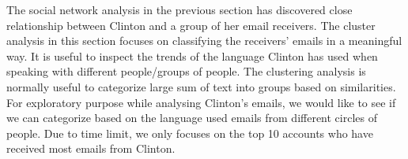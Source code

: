 The social network analysis in the previous section has discovered close relationship between Clinton and a group of her email receivers. The cluster analysis in this section focuses on classifying the receivers' emails in a meaningful way. It is useful to inspect the trends of the language Clinton has used when speaking with different people/groups of people. The clustering analysis is normally useful to categorize large sum of text into groups based on similarities. For exploratory purpose while analysing Clinton's emails, we would like to see if we can categorize based on the language used emails from different circles of people. Due to time limit, we only focuses on the top 10 accounts who have received most emails from Clinton.

